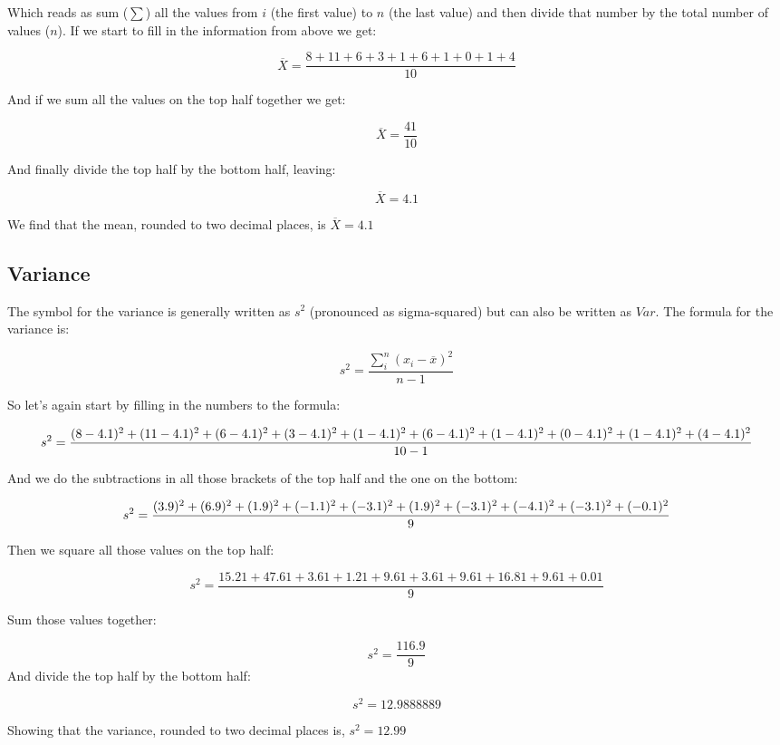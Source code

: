 \documentclass[
  oneside]{book}
\begin{document}
Which reads as sum (\(\sum\)) all the values from \(i\) (the first value) to \(n\) (the last value) and then divide that number by the total number of values (\(n\)). If we start to fill in the information from above we get:

\[\overline{X} = \frac{8 + 11 + 6 +3 +1 +6 +1 +0 +1 +4}{10}\]

And if we sum all the values on the top half together we get:

\[\overline{X} = \frac{41}{10}\]

And finally divide the top half by the bottom half, leaving:

\[\overline{X} = 4.1\]

We find that the mean, rounded to two decimal places, is \textbf{\(\overline{X} = 4.1\)}

\hypertarget{variance}{%
\subsection{Variance}\label{variance}}

The symbol for the variance is generally written as \(s^2\) (pronounced as sigma-squared) but can also be written as \(Var\). The formula for the variance is:

\[s^2 = \frac{\sum_i^n(x_{i} - \overline{x})^2}{n-1}\]

So let's again start by filling in the numbers to the formula:

\[s^2 = \frac{(8 - 4.1)^2 + (11 - 4.1)^2 + (6 - 4.1)^2 + (3 - 4.1)^2 + (1 - 4.1)^2 + \\(6 - 4.1)^2 + (1 - 4.1)^2 + (0 - 4.1)^2 + (1 - 4.1)^2 + (4 - 4.1)^2}{10 - 1}\]

And we do the subtractions in all those brackets of the top half and the one on the bottom:

\[s^2 = \frac{(3.9)^2 + (6.9)^2 + (1.9)^2 + (-1.1)^2 + (-3.1)^2 + \\(1.9)^2 + (-3.1)^2 + (-4.1)^2 + (-3.1)^2 + (-0.1)^2}{9}\]

Then we square all those values on the top half:

\[s^2 = \frac{15.21 + 47.61+ 3.61+ 1.21+ 9.61+ 3.61+ 9.61+ 16.81+ 9.61+ 0.01}{9}\]

Sum those values together:

\[s^2 = \frac{116.9}{9}\]
And divide the top half by the bottom half:

\[s^2 = 12.9888889\]

Showing that the variance, rounded to two decimal places is, \textbf{\(s^2 = 12.99\)}
\end{document}
